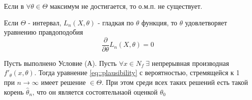 Если в \(\forall\theta\in\Theta\) максимум не достигается, то о.м.п. не существует.

Если \(\Theta\) - интервал, \(L_n(X, \theta)\) - гладкая по \(\theta\) функция,
то \(\theta\) удовлетворяет уравнению правдоподобия
\begin{equation} \label{eq::plausibility}
    \frac{\partial}{\partial\theta}L_n(X, \theta) = 0
\end{equation}
\begin{theorem}
    \label{th::consist_plausibility}
    Пусть выполнено Условие (А). Пусть \(\forall x \in N_f \ \exists\) непрерывная
    производная \(f'_{\theta}(x, \theta)\). Тогда уравнение \eqref{eq::plausibility}
    с вероятностью, стремящейся к 1 при \(n\rightarrow \infty\) имеет решение \(\in\Theta\).
    При этом среди всех таких решений есть такой корень \(\widehat{\theta}_n\), что он
    является состоятельнаой оценкой \(\theta_0\)
\end{theorem}

